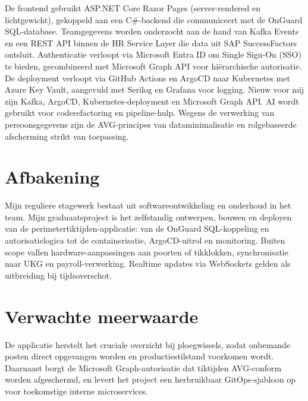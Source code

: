De frontend gebruikt ASP.NET Core Razor Pages (server-rendered en lichtgewicht), gekoppeld aan een C\#-backend die communiceert met de OnGuard SQL-database. Teamgegevens worden onderzocht aan de hand van Kafka Events en een REST API binnen de HR Service Layer die data uit SAP SuccessFactors ontsluit. Authenticatie verloopt via Microsoft Entra ID om Single Sign-On (SSO) te bieden, gecombineerd met Microsoft Graph API voor hiërarchische autorisatie. De deployment verloopt via GitHub Actions en ArgoCD naar Kubernetes met Azure Key Vault, aangevuld met Serilog en Grafana voor logging. Nieuw voor mij zijn Kafka, ArgoCD, Kubernetes-deployment en Microsoft Graph API. AI wordt gebruikt voor coderefactoring en pipeline-hulp. Wegens de verwerking van persoonsgegevens zijn de AVG-principes van dataminimalisatie en rolgebaseerde afscherming strikt van toepassing.


\section{Afbakening}%
\label{vst:afbakening}

Mijn reguliere stagewerk bestaat uit softwareontwikkeling en onderhoud in het team. Mijn graduaatsproject is het zelfstandig ontwerpen, bouwen en deployen van de perimetertiktijden-applicatie: van de OnGuard SQL-koppeling en autorisatielogica tot de containerisatie, ArgoCD-uitrol en monitoring. Buiten scope vallen hardware-aanpassingen aan poorten of tikklokken, synchronisatie naar UKG en payroll-verwerking. Realtime updates via WebSockets gelden als uitbreiding bij tijdsoverschot.


\section{Verwachte meerwaarde}%
\label{vst:meerwaarde}

De applicatie herstelt het cruciale overzicht bij ploegwissels, zodat onbemande posten direct opgevangen worden en productiestilstand voorkomen wordt. Daarnaast borgt de Microsoft Graph-autorisatie dat tiktijden AVG-conform worden afgeschermd, en levert het project een herbruikbaar GitOps-sjabloon op voor toekomstige interne microservices.


